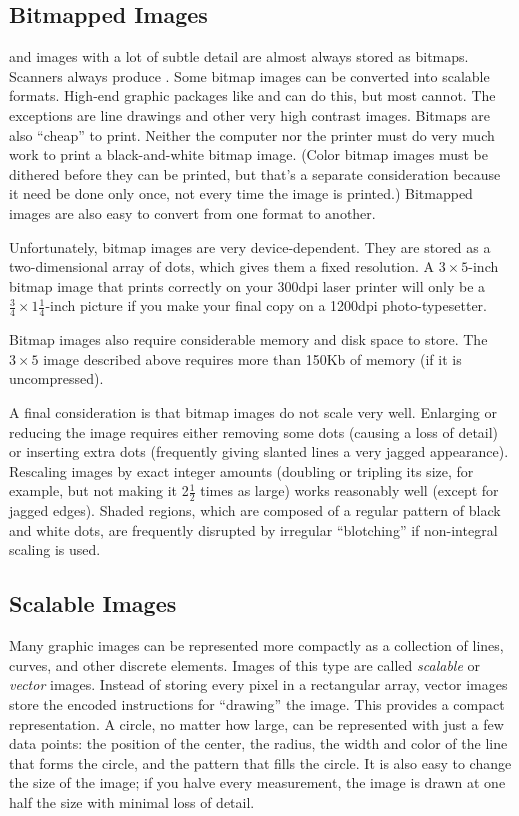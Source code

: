 \subsection{Bitmapped Images}

 and images 
with a lot of subtle detail are almost always
stored as bitmaps.  Scanners always produce .  Some
bitmap images can be converted into scalable formats. High-end graphic
packages like  and  can do this,
but most cannot.  The exceptions are line drawings and other
very high contrast images.  Bitmaps are also ``cheap'' to print.
Neither the computer nor the printer must do very much work to print a
black-and-white bitmap image.  (Color bitmap images must be dithered
before they can be printed, but that's a separate consideration because
it need be done only once, not every time the image is printed.)
Bitmapped images are also easy to convert from one format to another.

Unfortunately, bitmap images are very device-dependent.  They are
stored as a two-dimensional array of dots, which gives them a fixed
resolution.  A $3\times5$-inch bitmap image that prints correctly on your
300dpi laser printer will only be a $\frac{3}{4}\times1\frac{1}{4}$-inch
picture if you make your final copy on a 1200dpi photo-typesetter.

Bitmap images also require considerable memory and disk space to store.
The $3\times5$ image described above requires more than 150Kb of memory
(if it is uncompressed).

A final consideration is that bitmap images do not scale very well.
Enlarging or reducing the image requires either removing some dots (causing
a loss of detail) or inserting extra dots (frequently giving slanted lines 
a very jagged appearance).  Rescaling images by exact integer amounts 
(doubling or tripling its size, for example, but not making it 2$\frac{1}{2}$
times as large) works reasonably well (except for jagged edges).  
Shaded regions, which are composed of a regular pattern of black and white dots, are
frequently disrupted by irregular ``blotching'' if non-integral scaling
is used.

\subsection{Scalable Images}

Many graphic images can be represented more compactly as a collection
of lines, curves, and other discrete elements.  Images of this type
are called \emph{scalable} or \emph{vector} images.  Instead of storing every
pixel in a rectangular array, vector images store the encoded instructions
for ``drawing'' the image.  This provides a compact representation.
A circle, no matter how large, can be represented with
just a few data points: the position of the center, the radius,
the width and color of the line that forms the circle, and the 
pattern that fills the circle.  It is also easy to change the size of 
the image; if you halve every measurement, the image is drawn
at one half the size with minimal loss of detail.

